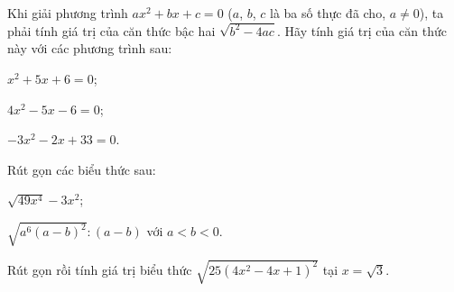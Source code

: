 \begin{practice}
\begin{questions}[series=SBT]
        \answerline
        \answerline

        \item Khi giải phương trình $ax^2+bx+c=0$ ($a$, $b$, $c$ là ba số thực đã cho, $a\ne0$), ta phải tính giá trị của căn thức bậc hai $\sqrt{b^2-4ac}$. Hãy tính giá trị của căn thức này với các phương trình sau:
        \begin{questions}
            \item $x^2+5x+6=0$;
            \item $4x^2-5x-6=0$;
            \item $-3x^2-2x+33=0$.
        \end{questions}

        \answerline
        \answerline

        \item Rút gọn các biểu thức sau:
        \begin{questions}
            \item $\sqrt{49x^4}-3x^2$;
            \item $\sqrt{a^6(a-b)^2}:(a-b)$ với $a<b<0$.
        \end{questions}

        \answerline
        \answerline

        \item Rút gọn rồi tính giá trị biểu thức $\sqrt{25(4x^2-4x+1)^2}$ tại $x=\sqrt{3}$.

        \answerline
        \answerline
    \end{questions}
\end{practice}
